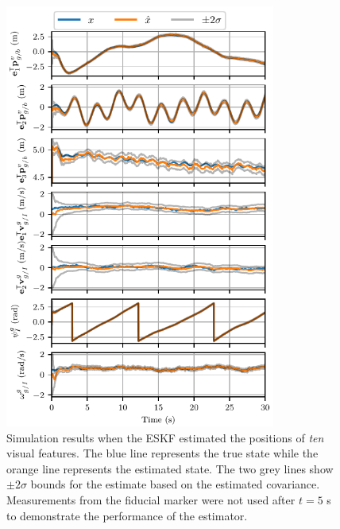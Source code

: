 \begin{figure}[htb]
  \centering
  \includegraphics[width=3.5in]{plots/single_run_with_lms}
  \caption[ESKF Simulation Results Using Ten Visual Features]{Simulation results
    when the ESKF estimated the positions of \emph{ten} visual
  features. The blue line represents the true state while the orange line
  represents the estimated state. The two grey lines show $\pm 2 \sigma$ bounds for
  the estimate based on the estimated covariance. Measurements from the fiducial
  marker were not used after $t = 5$ s
  to demonstrate the performance of the estimator.}
  \label{fig:with_lms}
\end{figure}




